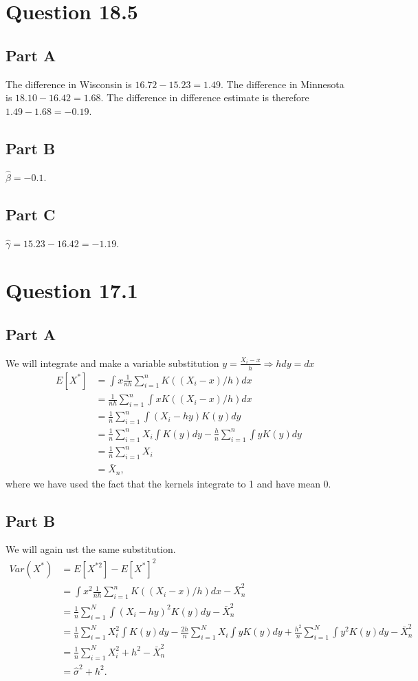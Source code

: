 \documentclass[11pt]{article} %
\begin{document}
\section{Question 18.5}
\subsection{Part A}
The difference in Wisconsin is $16.72 - 15.23 = 1.49$. The difference in Minnesota is $18.10-16.42 = 1.68$. The difference in difference estimate is therefore $1.49 - 1.68 = -0.19$.
\subsection{Part B}
$\hat{\beta} = -0.1$.
\subsection{Part C}
$\hat{\gamma} = 15.23 - 16.42 = -1.19.$

\section{Question 17.1}
\subsection{Part A}
We will integrate and make a variable substitution $y = \frac{X_i - x}{h}\Rightarrow h dy = dx$
\begin{align*}
E[X^*] &= \int x \frac{1}{nh} \sum_{i=1}^n K((X_i - x)/h) dx\\
&= \frac{1}{nh}\sum_{i=1}^n \int x K((X_i - x)/h) dx \\
&= \frac{1}{n}\sum_{i=1}^n \int (X_i - hy) K(y) dy  \\
&= \frac{1}{n}\sum_{i=1}^n X_i \int K(y) dy - \frac{h}{n}\sum_{i=1}^n \int y K(y) dy \\
&= \frac{1}{n}\sum_{i=1}^n X_i \\
&= \bar{X}_n,
\end{align*}
where we have used the fact that the kernels integrate to 1 and have mean 0.
\subsection{Part B}
We will again ust the same substitution.
\begin{align*}
Var(X^*) &= E[X^{*2}] - E[X^*]^2\\
&= \int x^2 \frac{1}{nh} \sum_{i=1}^n K((X_i - x)/h) dx -\bar{X}_n^2 \\
&= \frac{1}{n}\sum_{i=1}^N \int (X_i-hy)^2K(y)dy -\bar{X}_n^2\\
&= \frac{1}{n}\sum_{i=1}^N X_i^2 \int K(y)dy - \frac{2h}{n}\sum_{i=1}^N X_i \int yK(y)dy + \frac{h^2}{n}\sum_{i=1}^N \int y^2K(y)dy -\bar{X}_n^2\\
&= \frac{1}{n}\sum_{i=1}^N X_i^2  + h^2 - \bar{X}_n^2\\
&= \hat{\sigma}^2 + h^2.
\end{align*}
\end{document}
